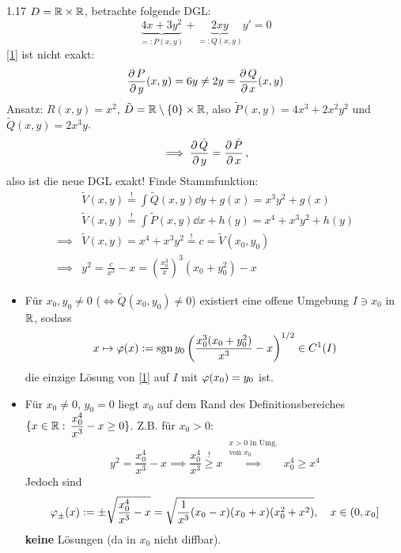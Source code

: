 \documentclass[a4paper]{article}
\begin{document}
\begin{Beispiel}{}{1.17}
$D=\mathbb R\times\mathbb R$, betrachte folgende DGL:
\[\underbrace{4x+3y^2}_{=:P(x,y)}+\underbrace{2xy}_{=:Q(x,y)}y'=0\tag{$*$}\label{1}\]
\eqref{1} ist nicht exakt:
\[\frac{\operatorname{\partial} P}{\operatorname{\partial} y}(x,y)=6y\ne 2y =\frac{\operatorname{\partial} Q}{\operatorname{\partial} x}(x,y)\]
Ansatz: $R(x,y)=x^2$, $\tilde{D}=\mathbb R\setminus \{0\}\times \mathbb R$, also $\tilde{P}(x,y)=4x^3+2x^2y^2$ und $\tilde{Q}(x,y)=2x^3y$.
\[\implies\frac{\operatorname{\partial}\tilde{Q}}{\operatorname{\partial} y}=\frac{\operatorname{\partial}\tilde{P}}{\operatorname{\partial} x}\,,\]
also ist die neue DGL exakt! Finde Stammfunktion:
\begin{align*}
    &\tilde{V}(x,y)\overset{!}{=}\int \tilde{Q}(x,y)\dd y+g(x)=x^3y^2+g(x)\\
    &\tilde{V}(x,y)\overset{!}{=}\int \tilde{P}(x,y)\dd x+h(y)=x^4+x^3y^2+h(y)\\
    \implies& \tilde{V}(x,y)=x^4+x^3y^2\overset{!}{=}c=\tilde{V}(x_0,y_0)\tag{$**$}\label{2}\\
    \implies & y^2=\frac{c}{x^3}-x= \left(\frac{x_0^3}{x}\right)^3(x_0+y_0^2)-x
\end{align*}
\begin{itemize}
\item Für $x_0,y_0\ne0$ ($\iff \tilde{Q}(x_0,y_0)\ne 0$) existiert eine offene Umgebung $I\ni x_0$ in $\mathbb R$, sodass
\[x\mapsto \operatorname{\varphi}(x):=\operatorname{\mathrm{sgn}} y_0\left(\frac{x_0^3(x_0+y_0^2)}{x^3}-x\right)^{1/2}\in C^1(I)\]
die einzige Lösung von \eqref{1} auf $I$ mit $\operatorname{\varphi}(x_0)=y_0$ ist.
\item Für $x_0\ne 0$, $y_0=0$ liegt $x_0$ auf dem Rand des Definitionsbereiches $\{x\in\mathbb R:\, \dfrac{x_0^4}{x^3}-x\ge 0\}$. Z.B. für $x_0>0$:
\[y^2=\frac{x_0^4}{x^3}-x\implies \frac{x_0^4}{x^3}\overset{!}{\ge} x\overset{\substack{\text{$x>0$ in Umg.}\\\text{von $x_0$}}}{\implies} x_0^4\ge x^4\]
Jedoch sind
\[\operatorname{\varphi}_{\pm}(x):=\pm\sqrt{\frac{
x_0^4}{x^3}-x}=\sqrt{\frac{1}{x^3}(x_0-x)(x_0+x)(x_0^2+x^2)},\;\;\,\;x\in (0,x_0]\]
\textbf{keine} Lösungen (da in $x_0$ nicht diffbar).
\begin{center}
\begin{minipage}{0.35\linewidth}
\centering
{}
\end{minipage}
\end{center}
\end{itemize}
\end{Beispiel}
\end{document}
